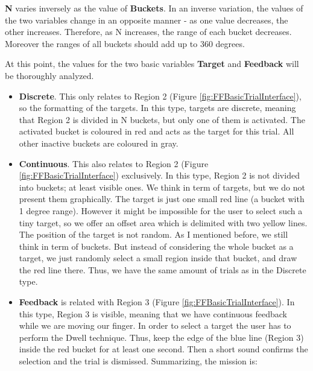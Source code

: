 \textbf{N} varies inversely as the value of \textbf{Buckets}. In an inverse variation, the values of the two variables change in an opposite manner - as one value decreases, the other increases. Therefore, as N increases, the range of each bucket decreases. Moreover the ranges of all buckets should add up to 360 degrees. 

At this point, the values for the two basic variables \textbf{Target} and \textbf{Feedback} will be thoroughly analyzed.




\begin{itemize}
	\item \textbf{Discrete}. This only relates to Region 2 (Figure \ref{fig:FFBasicTrialInterface}), so the formatting of the targets. In this type, targets are discrete, meaning that Region 2 is divided in N buckets, but only one of them is activated. The activated bucket is coloured in red and acts as the target for this trial. All other inactive buckets are coloured in gray. 

	\item \textbf{Continuous}. This also relates to Region 2 (Figure \ref{fig:FFBasicTrialInterface}) exclusively. In this type, Region 2 is not divided into buckets; at least visible ones. We think in term of targets, but we do not present them graphically. The target is just one small red line (a bucket with 1 degree range). However it might be impossible for the user to select such a tiny target, so we offer an offset area which is delimited with two yellow lines. The position of the target is not random. As I mentioned before, we still think in term of buckets. But instead of considering the whole bucket as a target, we just randomly select a small region inside that bucket, and draw the red line there. Thus, we have the same amount of trials as in the Discrete type.

	\item \textbf{Feedback} is related with Region 3 (Figure \ref{fig:FFBasicTrialInterface}). In this type, Region 3 is visible, meaning that we have continuous feedback while we are moving our finger. In order to select a target the user has to perform the Dwell technique. Thus, keep the edge of the blue line (Region 3) inside the red bucket for at least one second. Then a short sound confirms the selection and the trial is dismissed. Summarizing, the mission is: 


\end{itemize}
